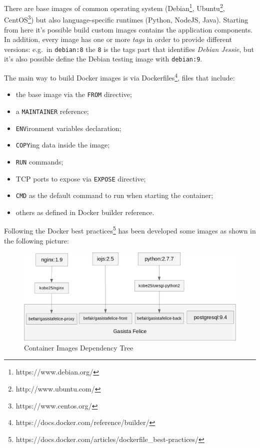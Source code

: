 There are base images of common operating system (Debian\footnote{https://www.debian.org/}, Ubuntu\footnote{http://www.ubuntu.com/},
CentOS\footnote{https://www.centos.org/}) but also language-specific runtimes (Python, NodeJS, Java).
Starting from here it's possible build custom images contains the
application components. In addition, every image has one or more
\textit{tags} in order to provide different versions: e.g.~in
\texttt{debian:8} the \texttt{8} is the tags part that identifies
\textit{Debian Jessie}, but it's also possible define the Debian testing
image with \texttt{debian:9}.

The main way to build Docker images is via Dockerfiles\footnote{https://docs.docker.com/reference/builder/}, files that include:
\begin{itemize}

\item
  the base image via the \texttt{FROM} directive;
\item
  a \texttt{MAINTAINER} reference;
\item
  \texttt{ENV}ironment variables declaration;
\item
  \texttt{COPY}ing data inside the image;
\item
  \texttt{RUN} commands;
\item
  TCP ports to expose via \texttt{EXPOSE} directive;
\item
  \texttt{CMD} as the default command to run when starting the container;
\item
  others as defined in Docker builder reference.
\end{itemize}

Following the Docker best practices\footnote{https://docs.docker.com/articles/dockerfile\_best-practices/} has been
developed some images as shown in the following picture:

\begin{figure}[htbp]
\centering
\includegraphics{media/ch3-images_tree.png}
\caption{Container Images Dependency Tree}
\end{figure}

